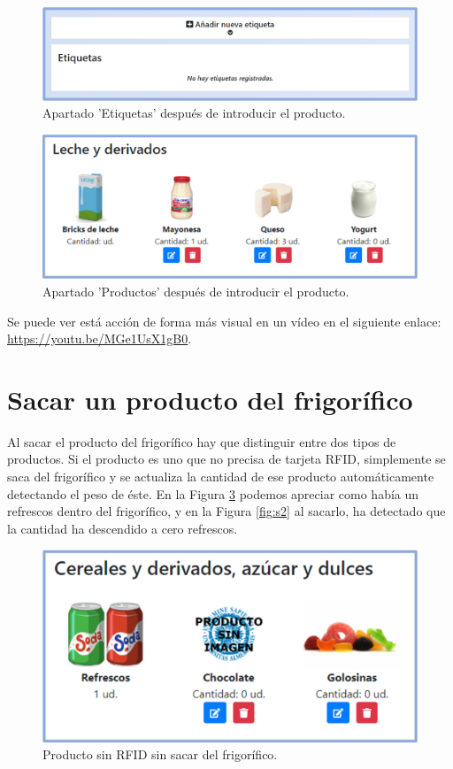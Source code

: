 \begin{figure}[h] 
    \centering
    \includegraphics[width=.90\textwidth]{capitulos/capitulo10/introducir/5.png}
    \caption{Apartado 'Etiquetas' después de introducir el producto.}
    \label{fig:i5}
\end{figure}
\begin{figure}[h] 
    \centering
    \includegraphics[width=.80\textwidth]{capitulos/capitulo10/introducir/6.png}
    \caption{Apartado 'Productos' después de introducir el producto.}
    \label{fig:i6}
\end{figure}

Se puede ver está acción de forma más visual en un vídeo en el siguiente enlace: \url{https://youtu.be/MGe1UsX1gB0}.

\section{Sacar un producto del frigorífico}
Al sacar el producto del frigorífico hay que distinguir entre dos tipos de productos. Si el producto es uno que no precisa de tarjeta RFID, simplemente se saca del frigorífico y se actualiza la cantidad de ese producto automáticamente detectando el peso de éste. En la Figura \ref{fig:s1} podemos apreciar como había un refrescos dentro del frigorífico, y en la Figura \ref{fig:s2} al sacarlo, ha detectado que la cantidad ha descendido a cero refrescos.

\begin{figure}[h] 
    \centering
    \includegraphics[width=.70\textwidth]{capitulos/capitulo10/sacar/1.png}
    \caption{Producto sin RFID sin sacar del frigorífico.}
    \label{fig:s1}
\end{figure}

